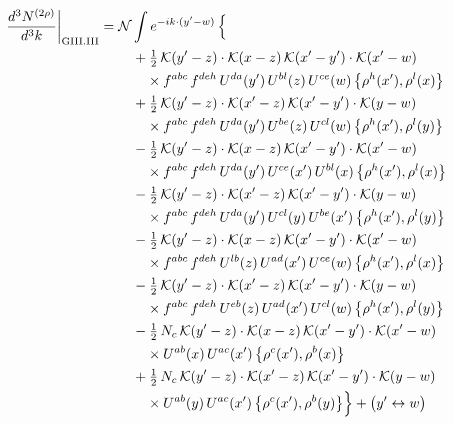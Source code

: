 \documentclass[10pt]{article}
\numberwithin{equation}{section}
\newcommand{\KK}{\mathcal K}
\newcommand{\NN}{\mathcal N}
\begin{document}
\begin{align}
\frac{d^3N^{(2\rho)}}{d^3k}\bigg|_{\rm GIII.III}={}&\NN\int e^{-ik\cdot(y'-w)}\,\Big\{\notag\\
&\quad +\tfrac12\,\KK(y'-z)\cdot\KK(x-z)\,\KK(x'-y')\cdot\KK(x'-w)\notag\\
&\qquad\times f^{abc}\,f^{deh}\,U^{da}(y')\,U^{bl}(z)\,U^{ce}(w)\,\big\{\rho^{h}(x'),\rho^{l}(x)\big\}\notag\\
&\quad +\tfrac12\,\KK(y'-z)\cdot\KK(x'-z)\,\KK(x'-y')\cdot\KK(y-w)\notag\\
&\qquad\times f^{abc}\,f^{deh}\,U^{da}(y')\,U^{be}(z)\,U^{cl}(w)\,\big\{\rho^{h}(x'),\rho^{l}(y)\big\}\notag\\
&\quad -\tfrac12\,\KK(y'-z)\cdot\KK(x-z)\,\KK(x'-y')\cdot\KK(x'-w)\notag\\
&\qquad\times f^{abc}\,f^{deh}\,U^{da}(y')\,U^{ce}(x')\,U^{bl}(x)\,\big\{\rho^{h}(x'),\rho^{l}(x)\big\}\notag\\
&\quad -\tfrac12\,\KK(y'-z)\cdot\KK(x'-z)\,\KK(x'-y')\cdot\KK(y-w)\notag\\
&\qquad\times f^{abc}\,f^{deh}\,U^{da}(y')\,U^{cl}(y)\,U^{be}(x')\,\big\{\rho^{h}(x'),\rho^{l}(y)\big\}\notag\\
&\quad -\tfrac12\,\KK(y'-z)\cdot\KK(x-z)\,\KK(x'-y')\cdot\KK(x'-w)\notag\\
&\qquad\times f^{abc}\,f^{deh}\,U^{lb}(z)\,U^{ad}(x')\,U^{ce}(w)\,\big\{\rho^{h}(x'),\rho^{l}(x)\big\}\notag\\
&\quad -\tfrac12\,\KK(y'-z)\cdot\KK(x'-z)\,\KK(x'-y')\cdot\KK(y-w)\notag\\
&\qquad\times f^{abc}\,f^{deh}\,U^{eb}(z)\,U^{ad}(x')\,U^{cl}(w)\,\big\{\rho^{h}(x'),\rho^{l}(y)\big\}\notag\\
&\quad -\tfrac12\,N_{c}\,\KK(y'-z)\cdot\KK(x-z)\,\KK(x'-y')\cdot\KK(x'-w)\notag\\
&\qquad\times U^{ab}(x)\,U^{ac}(x')\,\big\{\rho^{c}(x'),\rho^{b}(x)\big\}\notag\\
&\quad +\tfrac12\,N_{c}\,\KK(y'-z)\cdot\KK(x'-z)\,\KK(x'-y')\cdot\KK(y-w)\notag\\
&\qquad\times U^{ab}(y)\,U^{ac}(x')\,\big\{\rho^{c}(x'),\rho^{b}(y)\big\}\Big\}+\big(y'\leftrightarrow w\big)\label{R:eq:sum-GIII.III}
\end{align}
\end{document}
